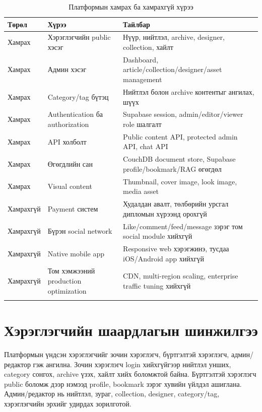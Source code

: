 \begin{longtable}{|L{0.20\textwidth}|L{0.36\textwidth}|L{0.30\textwidth}|}
  \hline
  \textbf{Төрөл} & \textbf{Хүрээ} & \textbf{Тайлбар} \\ \hline
  Хамрах & Хэрэглэгчийн public хэсэг & Нүүр, нийтлэл, archive, designer, collection, хайлт \\ \hline
  Хамрах & Админ хэсэг & Dashboard, article/collection/designer/asset management \\ \hline
  Хамрах & Category/tag бүтэц & Нийтлэл болон archive контентыг ангилах, шүүх \\ \hline
  Хамрах & Authentication ба authorization & Supabase session, admin/editor/viewer role шалгалт \\ \hline
  Хамрах & API холболт & Public content API, protected admin API, chat API \\ \hline
  Хамрах & Өгөгдлийн сан & CouchDB document store, Supabase profile/bookmark/RAG өгөгдөл \\ \hline
  Хамрах & Visual content & Thumbnail, cover image, look image, media asset \\ \hline
  Хамрахгүй & Payment систем & Худалдан авалт, төлбөрийн урсгал дипломын хүрээнд орохгүй \\ \hline
  Хамрахгүй & Бүрэн social network & Like/comment/feed/message зэрэг том social module хийхгүй \\ \hline
  Хамрахгүй & Native mobile app & Responsive web хэрэгжинэ, тусдаа iOS/Android app хийхгүй \\ \hline
  Хамрахгүй & Том хэмжээний production optimization & CDN, multi-region scaling, enterprise traffic tuning хийхгүй \\ \hline
  \caption{Платформын хамрах ба хамрахгүй хүрээ}
  \label{tab:scope-in-out}\\
\end{longtable}

\section{Хэрэглэгчийн шаардлагын шинжилгээ}
Платформын үндсэн хэрэглэгчийг зочин хэрэглэгч, бүртгэлтэй хэрэглэгч, админ/редактор гэж ангилна. Зочин хэрэглэгч login хийхгүйгээр нийтлэл унших, category сонгох, archive үзэх, хайлт хийх боломжтой байна. Бүртгэлтэй хэрэглэгч public боломж дээр нэмээд profile, bookmark зэрэг хувийн үйлдэл ашиглана. Админ/редактор нь нийтлэл, зураг, collection, designer, category/tag, хэрэглэгчийн эрхийг удирдах зорилготой.

